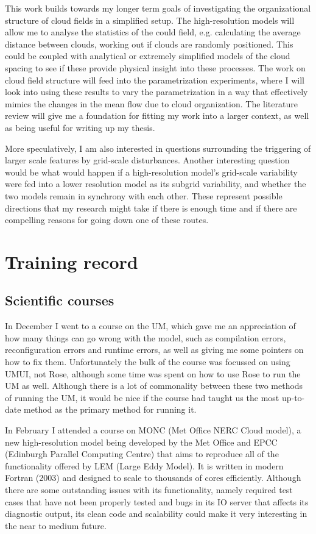\documentclass[11pt,a4paper]{article}
\begin{document}
This work builds towards my longer term goals of investigating the organizational structure of cloud
fields in a simplified setup. The high-resolution models will allow me to analyse the statistics of
the could field, e.g. calculating the average distance between clouds, working out if clouds are
randomly positioned. This could be coupled with analytical or extremely simplified models of the
cloud spacing to see if these provide physical insight into these processes. The work on cloud field
structure will feed into the parametrization experiments, where I will look into using these results
to vary the parametrization in a way that effectively mimics the changes in the mean flow due to
cloud organization. The literature review will give me a foundation for fitting my work into a
larger context, as well as being useful for writing up my thesis. 

More speculatively, I am also interested in questions surrounding the triggering of larger scale
features by grid-scale disturbances. Another interesting question would be what would happen if a
high-resolution model's grid-scale variability were fed into a lower resolution model as its subgrid
variability, and whether the two models remain in synchrony with each other. These represent
possible directions that my research might take if there is enough time and if there are compelling
reasons for going down one of these routes.

\section{Training record}

\subsection{Scientific courses}
\label{sec:Scientific courses}
In December I went to a course on the UM, which gave me an appreciation of how many things can go
wrong with the model, such as compilation errors, reconfiguration errors and runtime errors, as well
as giving me some pointers on how to fix them. Unfortunately the bulk of the course was focussed on
using UMUI, not Rose, although some time was spent on how to use Rose to run the UM as well.
Although there is a lot of commonality between these two methods of running the UM, it would be nice
if the course had taught us the most up-to-date method as the primary method for running it.

In February I attended a course on MONC (Met Office NERC Cloud model), a new high-resolution model
being developed by the Met Office and EPCC (Edinburgh Parallel Computing Centre) that aims to
reproduce all of the functionality offered by LEM (Large Eddy Model). It is written in modern
Fortran (2003) and designed to scale to thousands of cores efficiently. Although there are some
outstanding issues with its functionality, namely required test cases that have not been properly
tested and bugs in its IO server that affects its diagnostic output, its clean code and scalability
could make it very interesting in the near to medium future.
\end{document}
